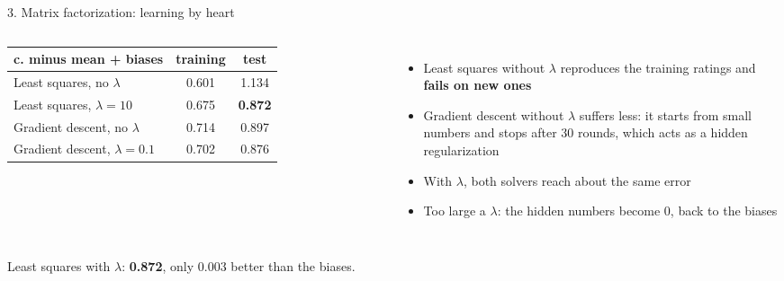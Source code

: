 \documentclass[aspectratio=169,11pt]{beamer}
\newcommand{\key}[1]{\textcolor{accent}{\textbf{#1}}}
\newcommand{\takeaway}[1]{\vfill\begin{center}\colorbox{accent!8}{\parbox{0.9\textwidth}{\centering #1}}\end{center}}
\begin{document}
\begin{frame}{3. Matrix factorization: learning by heart}
\begin{columns}[c]
\small
\begin{tabular}{@{}lcc@{}}
\toprule
c. minus mean + biases & \textbf{training} & \textbf{test} \\
\midrule
Least squares, no $\lambda$ & 0.601 & 1.134 \\
Least squares, $\lambda = 10$ & 0.675 & \key{0.872} \\
Gradient descent, no $\lambda$ & 0.714 & 0.897 \\
Gradient descent, $\lambda = 0.1$ & 0.702 & 0.876 \\
\bottomrule
\end{tabular}
\begin{itemize}\small
  \item Least squares without $\lambda$ reproduces the training ratings and \key{fails on new ones}
  \item Gradient descent without $\lambda$ suffers less: it starts from small numbers and stops after 30 rounds, which acts as a hidden regularization
  \item With $\lambda$, both solvers reach about the same error
  \item Too large a $\lambda$: the hidden numbers become 0, back to the biases
\end{itemize}
\end{columns}
\takeaway{Least squares with $\lambda$: \key{0.872}, only 0.003 better than the biases.}
\end{frame}
\end{document}
